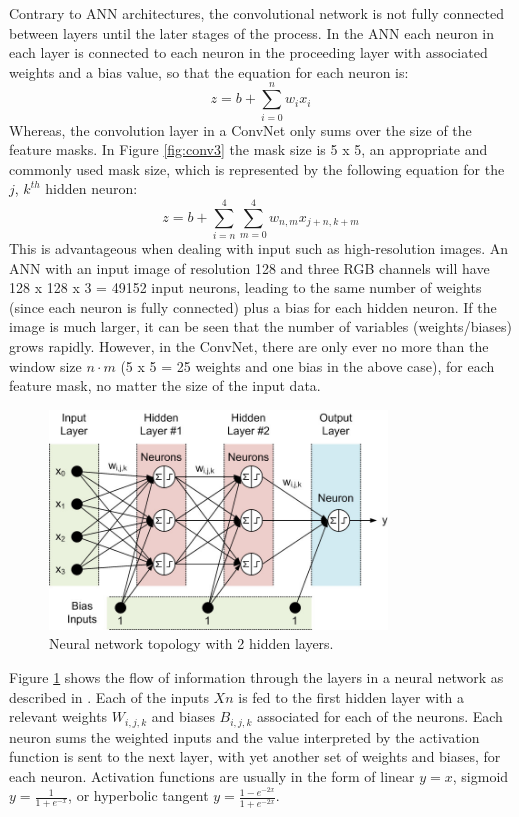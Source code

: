 \documentclass[fleqn,twoside,12pt]{report}
\begin{document}
Contrary to ANN architectures, the convolutional network is not fully connected between layers until the later stages of the process. In the ANN each neuron in each layer is connected to each neuron in the proceeding layer with associated weights and a bias value, so that the equation for each neuron is:
\begin{equation}
z = b + \sum_{i=0}^{n} w_i x_i
\end{equation}
Whereas, the convolution layer in a ConvNet only sums over the size of the feature masks. In Figure \ref{fig:conv3} the mask size is 5 x 5, an appropriate and commonly used mask size, which is represented by the following equation for the $j$, $k^{th}$ hidden neuron:
\begin{equation}
z = b + \sum_{i=n}^{4} \sum_{m=0}^{4} w_{n,m}  x_{j+n,k+m}
\end{equation}
This is advantageous when dealing with input such as high-resolution images. An ANN with an input image of resolution 128 and three RGB channels will have 128 x 128 x 3 = 49152 input neurons, leading to the same number of weights (since each neuron is fully connected) plus a bias for each hidden neuron. If the image is much larger, it can be seen that the number of variables (weights/biases) grows rapidly. However, in the ConvNet, there are only ever no more than the window size $n \cdot m$ (5 x 5 = 25 weights and one bias in the above case), for each feature mask, no matter the size of the input data.



\begin{figure}[h]
	\centering
	\includegraphics[width=0.8\textwidth]{neural_net.jpeg}
	\caption{Neural network topology with 2 hidden layers.}
	\label{fig:neural_net}
\end{figure}

Figure \ref{fig:neural_net} shows the flow of information through the layers in a neural network as described in \cite{smith}. Each of the inputs $Xn$ is fed to the first hidden layer with a relevant weights $W_{i,j,k}$ and biases $B_{i,j,k}$ associated for each of the neurons. Each neuron sums the weighted inputs and the value interpreted by the activation function is sent to the next layer, with yet another set of weights and biases, for each neuron. Activation functions are usually in the form of linear $y=x$, sigmoid $y=\frac{1}{1+e^{-x}}$, or hyperbolic tangent $y=\frac{1-e^{-2x}}{1+e^{-2x}}$.
\end{document}
